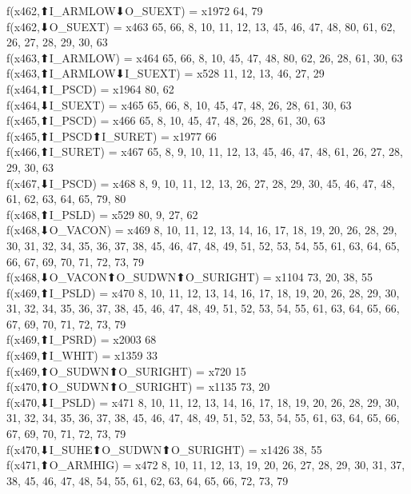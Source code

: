 f(x462,⬆I_ARMLOW⬇O_SUEXT) = x1972 {64, 79} \\
f(x462,⬇O_SUEXT) = x463 {65, 66, 8, 10, 11, 12, 13, 45, 46, 47, 48, 80, 61, 62, 26, 27, 28, 29, 30, 63} \\
f(x463,⬆I_ARMLOW) = x464 {65, 66, 8, 10, 45, 47, 48, 80, 62, 26, 28, 61, 30, 63} \\
f(x463,⬆I_ARMLOW⬇I_SUEXT) = x528 {11, 12, 13, 46, 27, 29} \\
f(x464,⬆I_PSCD) = x1964 {80, 62} \\
f(x464,⬇I_SUEXT) = x465 {65, 66, 8, 10, 45, 47, 48, 26, 28, 61, 30, 63} \\
f(x465,⬆I_PSCD) = x466 {65, 8, 10, 45, 47, 48, 26, 28, 61, 30, 63} \\
f(x465,⬆I_PSCD⬆I_SURET) = x1977 {66} \\
f(x466,⬆I_SURET) = x467 {65, 8, 9, 10, 11, 12, 13, 45, 46, 47, 48, 61, 26, 27, 28, 29, 30, 63} \\
f(x467,⬇I_PSCD) = x468 {8, 9, 10, 11, 12, 13, 26, 27, 28, 29, 30, 45, 46, 47, 48, 61, 62, 63, 64, 65, 79, 80} \\
f(x468,⬆I_PSLD) = x529 {80, 9, 27, 62} \\
f(x468,⬇O_VACON) = x469 {8, 10, 11, 12, 13, 14, 16, 17, 18, 19, 20, 26, 28, 29, 30, 31, 32, 34, 35, 36, 37, 38, 45, 46, 47, 48, 49, 51, 52, 53, 54, 55, 61, 63, 64, 65, 66, 67, 69, 70, 71, 72, 73, 79} \\
f(x468,⬇O_VACON⬆O_SUDWN⬆O_SURIGHT) = x1104 {73, 20, 38, 55} \\
f(x469,⬆I_PSLD) = x470 {8, 10, 11, 12, 13, 14, 16, 17, 18, 19, 20, 26, 28, 29, 30, 31, 32, 34, 35, 36, 37, 38, 45, 46, 47, 48, 49, 51, 52, 53, 54, 55, 61, 63, 64, 65, 66, 67, 69, 70, 71, 72, 73, 79} \\
f(x469,⬆I_PSRD) = x2003 {68} \\
f(x469,⬆I_WHIT) = x1359 {33} \\
f(x469,⬆O_SUDWN⬆O_SURIGHT) = x720 {15} \\
f(x470,⬆O_SUDWN⬆O_SURIGHT) = x1135 {73, 20} \\
f(x470,⬇I_PSLD) = x471 {8, 10, 11, 12, 13, 14, 16, 17, 18, 19, 20, 26, 28, 29, 30, 31, 32, 34, 35, 36, 37, 38, 45, 46, 47, 48, 49, 51, 52, 53, 54, 55, 61, 63, 64, 65, 66, 67, 69, 70, 71, 72, 73, 79} \\
f(x470,⬇I_SUHE⬆O_SUDWN⬆O_SURIGHT) = x1426 {38, 55} \\
f(x471,⬆O_ARMHIG) = x472 {8, 10, 11, 12, 13, 19, 20, 26, 27, 28, 29, 30, 31, 37, 38, 45, 46, 47, 48, 54, 55, 61, 62, 63, 64, 65, 66, 72, 73, 79} \\

